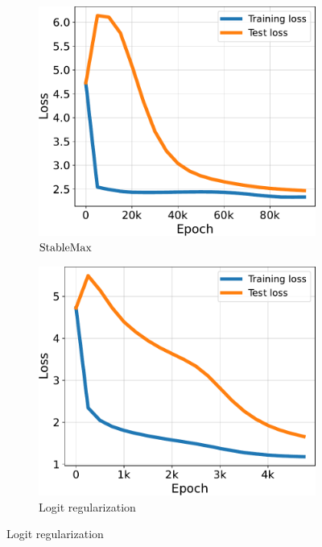 \begin{figure}[t]
\centering
\begin{subfigure}{.33\textwidth}
  \centering
  \includegraphics[width=\linewidth]{grokking_iclr_arxiv/figures/softermax_loss.pdf}
  \caption{$\mathrm{StableMax}$}
  \label{fig:additional_grokking_stablemax}
\end{subfigure}%
\hfill
\begin{subfigure}{.33\textwidth}
  \centering
  \includegraphics[width=\linewidth]{grokking_iclr_arxiv/figures/logit_reg_loss.pdf}
  \caption{Logit regularization}
  \label{fig:additional_grokking_logit}
  

\end{subfigure}
\end{figure}
